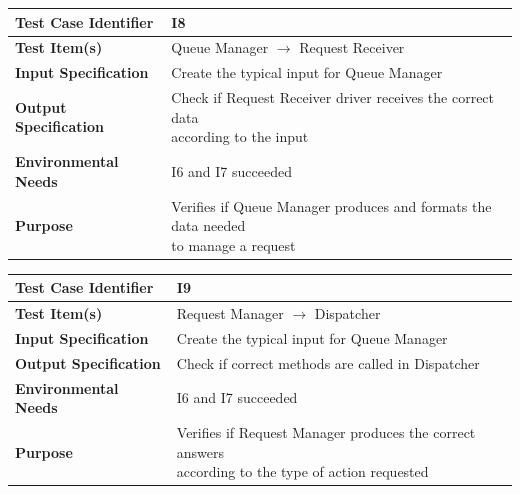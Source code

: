 \documentclass[11pt,titlepage]{article} %
\begin{document}
  \begin{table}[ht!]
    \begin{tabular*}{16cm}{ll}
	\hline
	\textbf{Test Case Identifier} & I8 \\
	\hline
	\textbf{Test Item(s)} & Queue Manager $ \longrightarrow $ Request Receiver \\
	\hline
	\textbf{Input Specification} & Create the typical input for Queue Manager \\
	\hline
	\textbf{Output Specification} & \pbox{20cm}{Check if Request Receiver driver receives the correct data \\ according to the input} \\
	\hline
	\textbf{Environmental Needs} & I6 and I7 succeeded\\
	\hline
	\textbf{Purpose} & \pbox{20cm}{Verifies if Queue Manager produces and formats the data needed \\ to manage a request} \\
	\hline
    \end{tabular*}
  \end{table}
  
  \begin{table}[ht!]
    \begin{tabular*}{16cm}{ll}
	\hline
	\textbf{Test Case Identifier} & I9 \\
	\hline
	\textbf{Test Item(s)} & Request Manager $ \longrightarrow $ Dispatcher \\
	\hline
	\textbf{Input Specification} & Create the typical input for Queue Manager \\
	\hline
	\textbf{Output Specification} & Check if correct methods are called in Dispatcher \\
	\hline
	\textbf{Environmental Needs} & I6 and I7 succeeded\\
	\hline
	\textbf{Purpose} & \pbox{20cm}{Verifies if Request Manager produces the correct answers \\ according to the type of action requested} \\
	\hline
    \end{tabular*}
  \end{table}
    
\newpage
\end{document}
